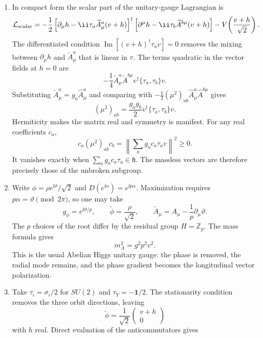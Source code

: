 \begin{enumerate}
\begin{enumerate}
    Gribov copies can obstruct a global slice.
    \item[(d)]
    In compact form the scalar part of the unitary-gauge Lagrangian is
    \[
      \mathcal L_{\rm scalar}
       =-\frac12\left[
         \partial_\mu h-\ii\tau_a\widetilde A_\mu^a(v+h)\right]^\dagger
        \left[
         \partial^\mu h-\ii\tau_b\widetilde A^{b\mu}(v+h)\right]
        -V\!\left(\frac{v+h}{\sqrt2}\right).
    \]
    The differentiated condition
    \(\operatorname{Im}[(v+h)^\dagger\tau_av]=0\) removes the mixing
    between \(\partial_\mu h\) and \(\widetilde A_\mu^a\) that is linear in
    \(v\).  The terms quadratic in the vector fields at \(h=0\) are
    \[
      -\frac14\widetilde A_\mu^a\widetilde A^{b\mu}
        v^\dagger\{\tau_a,\tau_b\}v.
    \]
    Substituting
    \(\widetilde A_\mu^a=g_a\widehat A_\mu^a\) and comparing with
    \(-\tfrac12(\mu^2)_{ab}\widehat A_\mu^a\widehat A^{b\mu}\) gives
    \[
      \boxed{(\mu^2)_{ab}
        =\frac{g_ag_b}{2}v^\dagger\{\tau_a,\tau_b\}v.}
    \]
    Hermiticity makes the matrix real and symmetry is manifest.  For any
    real coefficients \(c_a\),
    \[
      c_a(\mu^2)_{ab}c_b
        =\left\|\sum_a g_ac_a\tau_av\right\|^2\ge0.
    \]
    It vanishes exactly when
    \(\sum_ag_ac_a\tau_a\in\mathfrak h\).  The massless vectors are
    therefore precisely those of the unbroken subgroup.
    \item[(e)]
    Write
    \(\phi=\rho e^{\ii\vartheta}/\sqrt2\) and
    \(D(e^{\ii\alpha})=e^{\ii p\alpha}\).  Maximization requires
    \(p\alpha=\vartheta\pmod{2\pi}\), so one may take
    \[
      g_\phi=e^{\ii\vartheta/p},\qquad
      \widetilde\phi=\frac{\rho}{\sqrt2},\qquad
      \widetilde A_\mu=A_\mu-\frac1p\partial_\mu\vartheta.
    \]
    The \(p\) choices of the root differ by the residual group
    \(H=\mathbb Z_p\).  The mass formula gives
    \[
      \boxed{m_A^2=g^2p^2v^2.}
    \]
    This is the usual Abelian Higgs unitary gauge: the phase is removed,
    the radial mode remains, and the phase gradient becomes the
    longitudinal vector polarization.
    \item[(f)]
    Take
    \(\tau_i=\sigma_i/2\) for \(SU(2)\) and
    \(\tau_Y=-\mathbf1/2\).  The stationarity condition removes the three
    orbit directions, leaving
    \[
      \widetilde\phi=\frac1{\sqrt2}
        \begin{pmatrix}v+h\\0\end{pmatrix}
    \]
    with \(h\) real.  Direct evaluation of the anticommutators gives
    \[
\]
\end{enumerate}
\end{enumerate}
